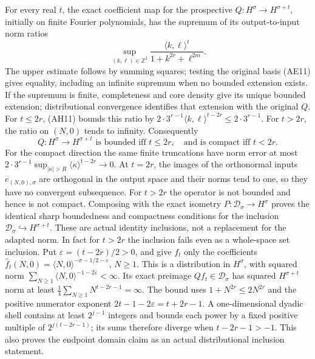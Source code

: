 \documentclass[
  11pt,
]{article}
\begin{document}
For every real \(t\), the exact coefficient map for the prospective
\(Q:H^\sigma\to H^{\sigma+t}\), initially on finite Fourier polynomials,
has the supremum of its output-to-input norm ratios \[
 \sup_{(k,\ell)\in\mathbb Z^2}
       \frac{\langle k,\ell\rangle^t}{1+k^{2r}+\ell^{2m}}.
 \tag{AE12}
\] The upper estimate follows by summing squares; testing the original
basis (AE11) gives equality, including an infinite supremum when no
bounded extension exists. If the supremum is finite, completeness and
core density give its unique bounded extension; distributional
convergence identifies that extension with the original \(Q\). For
\(t\leq2r\), (AH11) bounds this ratio by
\(2\cdot3^{r-1}\langle k,\ell\rangle^{t-2r}\leq2\cdot3^{r-1}\). For
\(t>2r\), the ratio on \((N,0)\) tends to infinity. Consequently \[
 Q:H^\sigma\longrightarrow H^{\sigma+t}\text{ is bounded iff }t\leq2r,
 \quad\text{and is compact iff }t<2r.
 \tag{AE13}
\] For the compact direction the same finite truncations have norm error
at most \(2\cdot3^{r-1}\sup_{|\kappa|>R}
\langle\kappa\rangle^{t-2r}\to0\). At \(t=2r\), the images of the
orthonormal inputs \(e_{(N,0),\sigma}\) are orthogonal in the output
space and their norms tend to one, so they have no convergent
subsequence. For \(t>2r\) the operator is not bounded and hence is not
compact. Composing with the exact isometry
\(P:\mathcal D_\sigma\to H^\sigma\) proves the identical sharp
boundedness and compactness conditions for the inclusion
\(\mathcal D_\sigma\hookrightarrow H^{\sigma+t}\). These are actual
identity inclusions, not a replacement for the adapted norm. In fact for
\(t>2r\) the inclusion fails even as a whole-space set inclusion. Put
\(\varepsilon=(t-2r)/2>0\), and give \(f_t\) only the coefficients
\(\widehat f_t(N,0)=\langle N,0\rangle^{-\sigma-1/2-\varepsilon}\),
\(N\geq1\). This is a distribution in \(H^\sigma\), with squared norm
\(\sum_{N\geq1}\langle N,0\rangle^{-1-2\varepsilon}<\infty\). Its exact
preimage \(Qf_t\in\mathcal D_\sigma\) has squared \(H^{\sigma+t}\) norm
at least \(\frac14\sum_{N\geq1}N^{t-2r-1}=\infty\). The bound uses
\(1+N^{2r}\leq2N^{2r}\) and the positive numerator exponent
\(2t-1-2\varepsilon=t+2r-1\). A one-dimensional dyadic shell contains at
least \(2^{j-1}\) integers and bounds each power by a fixed positive
multiple of \(2^{j(t-2r-1)}\); its sums therefore diverge when
\(t-2r-1>-1\). This also proves the endpoint domain claim as an actual
distributional inclusion statement.
\end{document}
